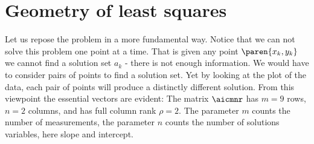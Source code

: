 \section{\label{sec:bevington geometry}Geometry of least squares }

Let us repose the problem in a more fundamental way.
Notice that we can not solve this problem one point at a time. That is given any point $\paren{x_{k}, y_{k}}$ we cannot find a solution set $a_{k}$ - there is not enough information. We would have to consider pairs of points to find a solution set. Yet by looking at the plot of the data, each pair of points will produce a distinctly different solution.
From this viewpoint the essential vectors are evident:
The matrix $\aicmnr$ has $m=9$ rows, $n=2$ columns, and has full column rank $\rho = 2$. The parameter $m$ counts the number of measurements, the parameter $n$ counts the number of solutions variables, here slope and intercept.


\endinput  %

